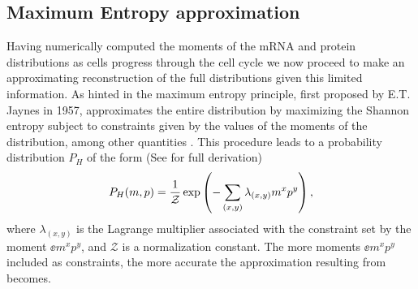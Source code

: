 \subsection{Maximum Entropy approximation}\label{sec_maxent}

Having numerically computed the moments of the mRNA and protein distributions as
cells progress through the cell cycle we now proceed to make an approximating
reconstruction of the full distributions given this limited information. As
hinted in  the maximum entropy principle, first proposed by
E.T. Jaynes in 1957, approximates the entire distribution by maximizing the
Shannon entropy subject to constraints given by the values of the moments of the
distribution, among other quantities \cite{Jaynes1957}. This procedure leads to
a probability distribution $P_H$ of the form (See  for full
derivation)
\begin{equation}
  P_H(m, p) = {1 \over \mathcal{Z}}
              \exp \left( - \sum_{(x,y)} \lambda_{(x,y)} m^x p^y \right),
  \label{eq_maxEnt_joint}
\end{equation}
where $\lambda_{(x,y)}$ is the Lagrange multiplier associated with the
constraint set by the moment $\ee{m^x p^y}$, and $\mathcal{Z}$ is a
normalization constant. The more moments $\ee{m^x p^y}$ included as constraints,
the more accurate the approximation resulting from 
becomes.

